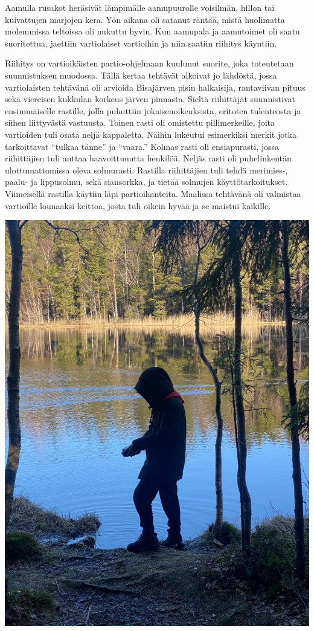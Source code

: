 \begin{multicols}{2}
Aamulla rusakot heräsivät lämpimälle aamupuurolle voisilmän, hillon tai
kuivattujen marjojen kera. Yön aikana oli satanut räntää, mistä huolimatta
molemmissa teltoissa oli nukuttu hyvin. Kun aamupala ja aamutoimet oli saatu
suoritettua, jaettiin vartiolaiset vartioihin ja niin saatiin riihitys
käyntiin.

Riihitys on vartioikäisten partio-ohjelmaan kuulunut suorite, joka toteutetaan
suunnistuksen muodossa. Tällä kertaa tehtävät alkoivat jo lähdöstä, jossa
vartiolaisten tehtävänä oli arvioida Bisajärven pisin halkaisija, rantaviivan
pituus sekä viereisen kukkulan korkeus järven pinnasta. Sieltä riihittäjät
suunnistivat ensimmäiselle rastille, jolla puhuttiin jokaisenoikeuksista,
eritoten tulenteosta ja siihen liittyvästä vastuusta. Toinen rasti oli
omistettu pillimerkeille, joita vartioiden tuli osata neljä kappaletta. Näihin
lukeutui esimerkiksi merkit jotka tarkoittavat “tulkaa tänne” ja “vaara.”
Kolmas rasti oli ensiapurasti, jossa riihittäjien tuli auttaa haavoittunutta
henkilöä. Neljäs rasti oli puhelinkentän ulottumattomissa oleva solmurasti.
Rastilla riihittäjien tuli tehdä merimies-, paalu- ja lippusolmu, sekä
siansorkka, ja tietää solmujen käyttötarkoitukset. Viimeisellä rastilla käytiin
läpi partioihanteita. Maalissa tehtävänä oli valmistaa vartioille lounaaksi
keittoa, josta tuli oikein hyvää ja se maistui kaikille.

\smallskip
\begin{center}
	\noindent\includegraphics[width=0.9\linewidth]{assets/telttaretki1}
\end{center}


\end{multicols}
